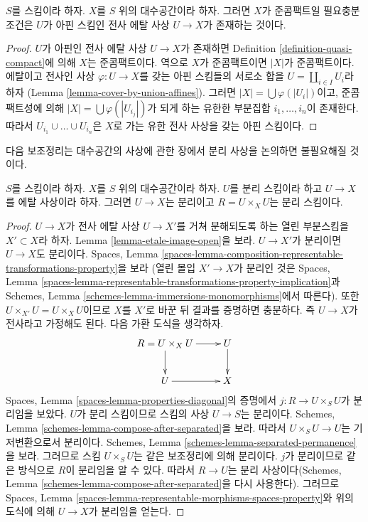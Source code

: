 \begin{lemma}
\label{lemma-quasi-compact-affine-cover}
$S$를 스킴이라 하자.
$X$를 $S$ 위의 대수공간이라 하자.
그러면 $X$가 준콤팩트일 필요충분조건은 $U$가 아핀 스킴인
전사 에탈 사상 $U \to X$가 존재하는 것이다.
\end{lemma}

\begin{proof}
$U$가 아핀인 전사 에탈 사상 $U \to X$가 존재하면 Definition
\ref{definition-quasi-compact}에 의해 $X$는 준콤팩트이다.
역으로 $X$가 준콤팩트이면 $|X|$가 준콤팩트이다.
에탈이고 전사인 사상 $\varphi : U \to X$를 갖는 아핀 스킴들의 서로소 합을
$U = \coprod_{i \in I} U_i$라 하자
(Lemma \ref{lemma-cover-by-union-affines}).
그러면 $|X| = \bigcup \varphi(|U_i|)$이고, 준콤팩트성에 의해
$|X| = \bigcup \varphi(|U_{i_j}|)$가 되게 하는 유한한 부분집합
$i_1, \ldots, i_n$이 존재한다. 따라서
$U_{i_1} \cup \ldots \cup U_{i_n}$은 $X$로 가는 유한 전사 사상을 갖는
아핀 스킴이다.
\end{proof}

\noindent
다음 보조정리는 대수공간의 사상에 관한 장에서 분리 사상을 논의하면
불필요해질 것이다.

\begin{lemma}
\label{lemma-separated-cover}
$S$를 스킴이라 하자.
$X$를 $S$ 위의 대수공간이라 하자.
$U$를 분리 스킴이라 하고 $U \to X$를 에탈 사상이라 하자.
그러면 $U \to X$는 분리이고 $R = U \times_X U$는 분리 스킴이다.
\end{lemma}

\begin{proof}
$U \to X$가 전사 에탈 사상 $U \to X'$를 거쳐 분해되도록 하는
열린 부분스킴을 $X' \subset X$라 하자. Lemma
\ref{lemma-etale-image-open}을 보라.
$U \to X'$가 분리이면 $U \to X$도 분리이다. Spaces, Lemma
\ref{spaces-lemma-composition-representable-transformations-property}을 보라
(열린 몰입 $X' \to X$가 분리인 것은 Spaces, Lemma
\ref{spaces-lemma-representable-transformations-property-implication}과
Schemes, Lemma \ref{schemes-lemma-immersions-monomorphisms}에서 따른다).
또한 $U \times_{X'} U = U \times_X U$이므로 $X$를 $X'$로 바꾼 뒤
결과를 증명하면 충분하다. 즉 $U \to X$가 전사라고 가정해도 된다.
다음 가환 도식을 생각하자.
$$
\xymatrix{
R = U \times_X U \ar[r] \ar[d] & U \ar[d] \\
U \ar[r] & X
}
$$
Spaces, Lemma \ref{spaces-lemma-properties-diagonal}의 증명에서
$j : R \to U \times_S U$가 분리임을 보았다.
$U$가 분리 스킴이므로 스킴의 사상 $U \to S$는 분리이다.
Schemes, Lemma \ref{schemes-lemma-compose-after-separated}을 보라.
따라서 $U \times_S U \to U$는 기저변환으로서 분리이다.
Schemes, Lemma \ref{schemes-lemma-separated-permanence}을 보라.
그러므로 스킴 $U \times_S U$는 같은 보조정리에 의해 분리이다.
$j$가 분리이므로 같은 방식으로 $R$이 분리임을 알 수 있다.
따라서 $R \to U$는 분리 사상이다(Schemes, Lemma
\ref{schemes-lemma-compose-after-separated}을 다시 사용한다).
그러므로 Spaces, Lemma
\ref{spaces-lemma-representable-morphisms-spaces-property}와 위의 도식에 의해
$U \to X$가 분리임을 얻는다.
\end{proof}


